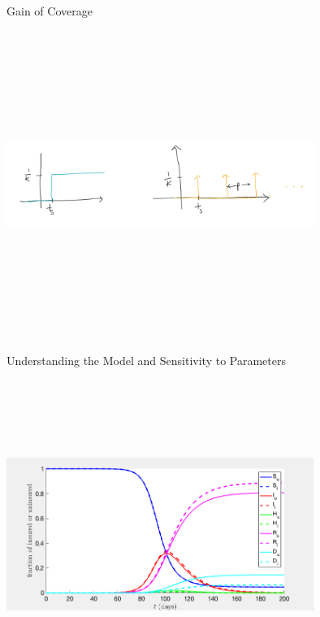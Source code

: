 \documentclass[notes]{beamer}
\begin{document}
\begin{frame}{Gain of Coverage}



\includegraphics[width=10cm,height=10cm,keepaspectratio]{gain.png}

\end{frame}




\begin{frame}{Understanding the Model and Sensitivity to Parameters}


\includegraphics[width=10cm,height=10cm,keepaspectratio]{image1.png}




\end{frame}
\end{document}
